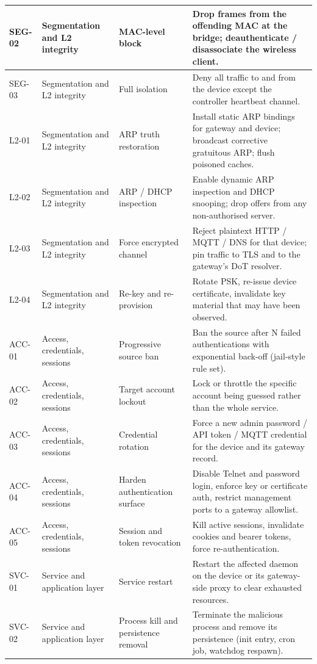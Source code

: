 \begin{longtable}{|p{}|p{}|p{}|p{}|}
\hline
SEG-02 & Segmentation and L2 integrity & MAC-level block & Drop frames from the offending MAC at the bridge; deauthenticate / disassociate the wireless client. \\
\hline
SEG-03 & Segmentation and L2 integrity & Full isolation & Deny all traffic to and from the device except the controller heartbeat channel. \\
\hline
L2-01 & Segmentation and L2 integrity & ARP truth restoration & Install static ARP bindings for gateway and device; broadcast corrective gratuitous ARP; flush poisoned caches. \\
\hline
L2-02 & Segmentation and L2 integrity & ARP / DHCP inspection & Enable dynamic ARP inspection and DHCP snooping; drop offers from any non-authorised server. \\
\hline
L2-03 & Segmentation and L2 integrity & Force encrypted channel & Reject plaintext HTTP / MQTT / DNS for that device; pin traffic to TLS and to the gateway's DoT resolver. \\
\hline
L2-04 & Segmentation and L2 integrity & Re-key and re-provision & Rotate PSK, re-issue device certificate, invalidate key material that may have been observed. \\
\hline
ACC-01 & Access, credentials, sessions & Progressive source ban & Ban the source after N failed authentications with exponential back-off (jail-style rule set). \\
\hline
ACC-02 & Access, credentials, sessions & Target account lockout & Lock or throttle the specific account being guessed rather than the whole service. \\
\hline
ACC-03 & Access, credentials, sessions & Credential rotation & Force a new admin password / API token / MQTT credential for the device and its gateway record. \\
\hline
ACC-04 & Access, credentials, sessions & Harden authentication surface & Disable Telnet and password login, enforce key or certificate auth, restrict management ports to a gateway allowlist. \\
\hline
ACC-05 & Access, credentials, sessions & Session and token revocation & Kill active sessions, invalidate cookies and bearer tokens, force re-authentication. \\
\hline
SVC-01 & Service and application layer & Service restart & Restart the affected daemon on the device or its gateway-side proxy to clear exhausted resources. \\
\hline
SVC-02 & Service and application layer & Process kill and persistence removal & Terminate the malicious process and remove its persistence (init entry, cron job, watchdog respawn). \\

\end{longtable}
